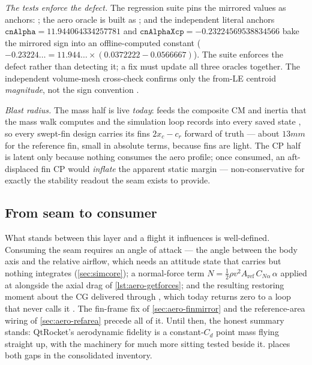 \begin{hardfail}
\emph{The tests enforce the defect.} The regression suite pins the mirrored values as
anchors:  ; the aero
oracle is built as 
; and the independent literal anchors
$\mathtt{cnAlpha} = 11.944064334257781$ and $\mathtt{cnAlphaXcp} = -0.23224569538834566$
 bake the mirrored sign into an offline-computed
constant ($-0.23224\ldots = 11.944\ldots \times (0.0372222 - 0.0566667)$). The suite
enforces the defect rather than detecting it; a fix must update all three oracles together.
The independent volume-mesh cross-check confirms only the from-LE centroid
\emph{magnitude}, not the sign convention .

\emph{Blast radius.} The mass half is live \emph{today}:  feeds the
composite CM and inertia that the mass walk computes  and
the simulation loop records into every saved state , so every
swept-fin design carries its fins $2x_c - c_r$ forward of truth --- about $13\unit{mm}$ for
the reference fin, small in absolute terms, because fins are light. The CP
half is latent only because nothing consumes the aero profile; once consumed, an
aft-displaced fin CP would \emph{inflate} the apparent static margin --- non-conservative
for exactly the stability readout the seam exists to provide. \fail
\end{hardfail}

\subsection{From seam to consumer}\label{sec:aero-consume}

What stands between this layer and a flight it influences is well-defined. Consuming the
seam requires an angle of attack --- the angle between the body axis and the relative
airflow, which needs an attitude state that  carries but nothing integrates
(\cref{sec:simcore}); a normal-force term
$N = \tfrac{1}{2}\rho v^2 A_{\mathrm{ref}}\,C_{N\alpha}\,\alpha$ applied at 
alongside the axial drag of \cref{lst:aero-getforces}; and the resulting restoring moment
about the CG delivered through , which today returns zero to a loop that
never calls it . The fin-frame fix of
\cref{sec:aero-finmirror} and the reference-area wiring of \cref{sec:aero-refarea} precede
all of it. Until then, the honest summary stands: QtRocket's aerodynamic fidelity is a
constant-$C_d$ point mass flying straight up, with the machinery for much more sitting
tested beside it.  places both gaps in the consolidated inventory.
